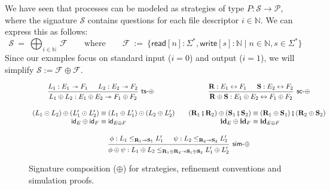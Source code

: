 \documentclass[acmsmall,screen,review,nonacm]{acmart}
\newcommand{\kw}[1]{\ensuremath{ \mathsf{#1} }}
\newcommand{\idsc}{\mathbf{id}} %
\newcommand{\vcomp}{\fatsemi}
\begin{document}
\begin{example}
We have seen that processes can be modeled as
strategies of type $P : \mathcal{S} \rightarrow \mathcal{P}$,
where the signature $\mathcal{S}$ contains questions for
each file descriptor $i \in \mathbb{N}$.
We can express this as follows:
\[
  \mathcal{S} \: = \: \bigoplus_{i \in \mathbb{N}} \: \mathcal{F}
  \qquad \text{where} \qquad
  \mathcal{F} \: := \:
    \{ \kw{read}[n] : \Sigma^*, \kw{write}[s] : \mathbb{N} \mid n \in \mathbb{N}, s \in \Sigma^* \}
\]
Since our examples focus on standard input ($i=0$) and output ($i=1$),
we will simplify $\mathcal{S} := \mathcal{F} \oplus \mathcal{F}$.
\end{example}

\begin{figure} %
  \begin{gather*}
    \begin{prooftree}
      \hypo{L_1 : E_1 \twoheadrightarrow F_1}
      \hypo{L_2 : E_2 \twoheadrightarrow F_2}
      \infer2[\kw{ts}-$\oplus$]{
        L_1 \oplus L_2 : E_1 \oplus E_2 \twoheadrightarrow F_1 \oplus F_2}
    \end{prooftree}
    \hspace{8em}
    \begin{prooftree}
      \hypo{\mathbf{R} : E_1 \leftrightarrow F_1}
      \hypo{\mathbf{S} : E_2 \leftrightarrow F_2}
      \infer2[\kw{sc}-$\oplus$]{
        \mathbf{R} \oplus \mathbf{S} : E_1 \oplus E_2 \leftrightarrow F_1 \oplus F_2
      }
    \end{prooftree}
    \\[1em]
    \begin{array}{r@{}l}
      (L_1 \odot L_2) \oplus (L_1' \odot L_2') & {} \equiv
      (L_1 \oplus L_1') \odot (L_2 \oplus L_2') \\
      \kw{id}_E \oplus \kw{id}_F & {} \equiv \kw{id}_{E \oplus F}
    \end{array}
    \quad
    \begin{array}{r@{}l}
      (\mathbf{R}_1 \vcomp \mathbf{R}_2) \oplus (\mathbf{S}_1 \vcomp \mathbf{S}_2)
      & {} \equiv
      (\mathbf{R}_1 \oplus \mathbf{S}_1) \vcomp (\mathbf{R}_2 \oplus \mathbf{S}_2)
      \\
      \idsc_E \oplus \idsc_F & {} \equiv \idsc_{E \oplus F}
    \end{array}
    \\[1em]
    \begin{prooftree}
      \hypo{\phi: L_1 \le_{\mathbf{R}_1 \twoheadrightarrow \mathbf{S}_1} L_1'}
      \hypo{\psi: L_2 \le_{\mathbf{R}_2 \twoheadrightarrow \mathbf{S}_2} L_2'}
      \infer2[\kw{sim}-$\oplus$]{\phi \oplus \psi :
	L_1 \oplus L_2
        \le_{\mathbf{R}_1 \oplus \mathbf{R}_2 \twoheadrightarrow
             \mathbf{S}_1 \oplus \mathbf{S}_2}
	L_1' \oplus L_2'}
    \end{prooftree}
  \end{gather*}
  \caption{Signature composition ($\oplus$) for strategies,
    refinement conventions and simulation proofs.}
  \label{fig:fcomp}
\end{figure}
\end{document}
